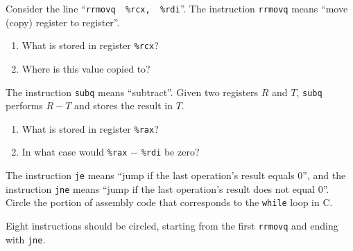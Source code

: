 \Q Consider the line ``\verb|rrmovq  %rcx,  %rdi|''.
The instruction \verb|rrmovq| means ``move (copy) register to register''.

\begin{enumerate}
\item What is stored in register \verb|%rcx|? 
\item Where is this value copied to? 
\end{enumerate}


\Q The instruction \verb|subq| means ``subtract''. Given two registers $R$ and $T$, \verb|subq| performs $R-T$ and stores the result in $T$.

\begin{enumerate}
\item What is stored in register \verb|%rax|? 
\item In what case would \verb|%rax| $-$ \verb|%rdi| be zero? 
\end{enumerate}


\Q The instruction \verb|je| means ``jump if the last operation's result equals 0'', and the instruction \verb|jne| means ``jump if the last operation's result does not equal 0''. Circle the portion of assembly code that corresponds to the \verb|while| loop in C.

\begin{answer}[2em]
Eight instructions should be circled, starting from the first {\tt rrmovq} and ending with {\tt jne}.
\end{answer}


%
